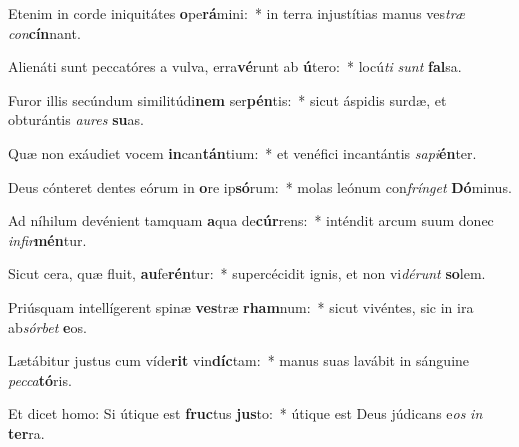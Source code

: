\item Etenim in corde iniquitátes \textbf{o}pe\textbf{rá}mini:~* in terra injustítias manus ves\textit{træ} \textit{con}\textbf{cín}nant.
\item Alienáti sunt peccatóres a vulva, erra\textbf{vé}runt ab \textbf{ú}tero:~* locú\textit{ti} \textit{sunt} \textbf{fal}sa.
\item Furor illis secúndum similitúdi\textbf{nem} ser\textbf{pén}tis:~* sicut áspidis surdæ, et obturántis \textit{au}\textit{res} \textbf{su}as.
\item Quæ non exáudiet vocem \textbf{in}can\textbf{tán}tium:~* et venéfici incantántis \textit{sa}\textit{pi}\textbf{én}ter.
\item Deus cónteret dentes eórum in \textbf{o}re ip\textbf{só}rum:~* molas leónum con\textit{frín}\textit{get} \textbf{Dó}minus.
\item Ad níhilum devénient tamquam \textbf{a}qua de\textbf{cúr}rens:~* inténdit arcum suum donec \textit{in}\textit{fir}\textbf{mén}tur.
\item Sicut cera, quæ fluit, \textbf{au}fe\textbf{rén}tur:~* supercécidit ignis, et non vi\textit{dé}\textit{runt} \textbf{so}lem.
\item Priúsquam intellígerent spinæ \textbf{ves}træ \textbf{rham}num:~* sicut vivéntes, sic in ira ab\textit{sór}\textit{bet} \textbf{e}os.
\item Lætábitur justus cum víde\textbf{rit} vin\textbf{díc}tam:~* manus suas lavábit in sánguine \textit{pec}\textit{ca}\textbf{tó}ris.
\item Et dicet homo: Si útique est \textbf{fruc}tus \textbf{jus}to:~* útique est Deus júdicans e\textit{os} \textit{in} \textbf{ter}ra.
